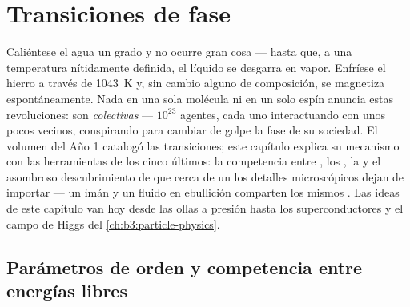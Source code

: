 \chapter{Transiciones de fase}\label{ch:b3:phase-transitions}

Caliéntese el agua un grado y no ocurre gran cosa --- hasta que, a una
temperatura nítidamente definida, el líquido se desgarra en vapor.
Enfríese el hierro a través de \qty{1043}{K} y, sin cambio alguno de composición,
se magnetiza espontáneamente. Nada en una sola molécula ni en un
solo espín anuncia estas revoluciones: son \emph{colectivas}
--- $10^{23}$ agentes, cada uno interactuando con unos pocos vecinos,
conspirando para cambiar de golpe la fase de su sociedad. El volumen del
Año 1 catalogó las transiciones; este capítulo explica su
mecanismo con las herramientas de los cinco últimos: la competencia entre
, los , la  y el asombroso
descubrimiento de que cerca de un  los detalles microscópicos dejan
de importar --- un imán y un fluido en ebullición comparten los mismos . Las ideas de este capítulo van hoy desde las ollas a presión
hasta los superconductores y el campo de Higgs del
\cref{ch:b3:particle-physics}.

\section{Parámetros de orden y competencia entre energías libres}

